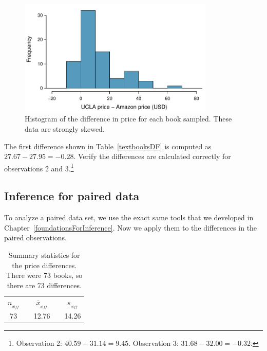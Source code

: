 \begin{figure}
\centering
\includegraphics[width=0.83\textwidth]{05/figures/textbooksS10/diffInTextbookPricesS10}
\caption{Histogram of the difference in price for each book sampled. These data are strongly skewed.}
\label{diffInTextbookPricesS10}
\end{figure}

\begin{exercise}
The first difference shown in Table~\ref{textbooksDF} is computed as $27.67-27.95=-0.28$. Verify the differences are calculated correctly for observations 2 and 3.\footnote{Observation 2: $40.59 - 31.14 = 9.45$. Observation 3: $31.68 - 32.00 = -0.32$.}
\end{exercise}

\subsection{Inference for paired data}

To analyze a paired data set, we use the exact same tools that we developed in Chapter~\ref{foundationsForInference}. Now we apply them to the differences in the paired observations.

\begin{table}[hh]
\centering
\begin{tabular}{ccccc}
\hline
$n_{_{diff}}$	&\hspace{3mm}& $\bar{x}_{_{diff}}$	&\hspace{3mm}& $s_{_{diff}}$ \vspace{1mm}\\
73			&& 12.76				&& 14.26 \\
\hline
\end{tabular}
\caption{Summary statistics for the price differences. There were 73 books, so there are 73 differences.}
\label{textbooksSummaryStats}
\end{table}


